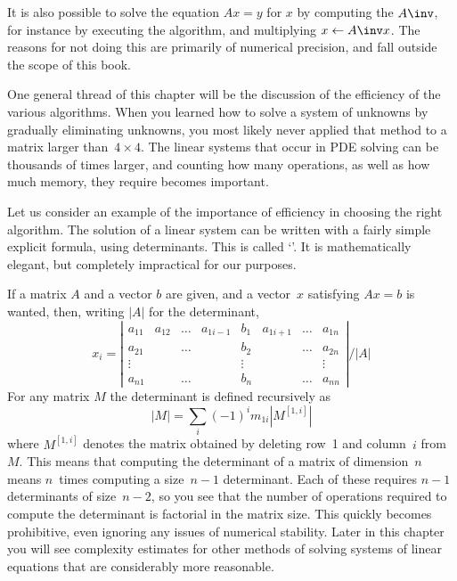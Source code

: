 \begin{remark}
  It is also possible to solve the equation $Ax=y$ for $x$ by
  computing the  $A\inv$, for instance
  by executing the  algorithm, and multiplying
  $x\leftarrow A\inv x$. The reasons for not doing this are primarily
  of numerical precision, and fall outside the scope of this book.
\end{remark}

One general thread of this chapter will be the discussion of the
efficiency of the various algorithms. When you learned how to solve a
system of unknowns by gradually eliminating unknowns, you most likely
never applied that method to a matrix larger than~$4\times4$. The
linear systems that occur in PDE solving can be thousands of times
larger, and counting how many operations, as well as how much memory,
they require becomes important.

Let us consider an example of the importance of efficiency in choosing
the right algorithm.
The solution of a linear system can be written with a fairly simple
explicit formula, using determinants. This is called
`'. It is mathematically elegant, but
completely impractical for our purposes.

If a matrix $A$ and a vector $b$ are given, and a vector~$x$
satisfying $Ax=b$ is wanted, then,
writing $|A|$ for the determinant,
  \[ x_i=\left|
    \begin{matrix}
      a_{11}&a_{12}&\ldots&a_{1i-1}&b_1&a_{1i+1}&\ldots&a_{1n}\\
      a_{21}&      &\ldots&        &b_2&        &\ldots&a_{2n}\\
      \vdots&      &      &        &\vdots&     &      &\vdots\\
      a_{n1}&      &\ldots&        &b_n&        &\ldots&a_{nn}
    \end{matrix}\right|
    / |A|
    \]
For any matrix $M$ the determinant is defined recursively as
\[ |M| = \sum_i (-1)^im_{1i}|M^{[1,i]}| \]
where $M^{[1,i]}$ denotes the matrix obtained by deleting row~1 and
column~$i$ from~$M$. This means that computing the determinant of a
matrix of dimension~$n$ means $n$~times computing a size~$n-1$
determinant. Each of these requires $n-1$ determinants of size~$n-2$, so
you see that the number of operations
required to compute the determinant is factorial in the matrix
size. This quickly becomes prohibitive, even ignoring any issues of
numerical stability.
Later in this chapter you will see complexity estimates for other
methods of solving systems of linear equations that are considerably
more reasonable.

